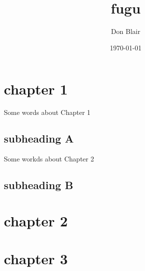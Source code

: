 \documentclass[11pt]{article}
\title{fugu}
\author{Don Blair}
\date{\today}
\begin{document}
\maketitle

\setcounter{tocdepth}{3}
\tableofcontents
\vspace*{1cm}
\section{chapter 1}
\label{sec-1}

Some words about Chapter 1
\subsection{subheading A}
\label{sec-1-1}

Some workds about Chapter 2
\subsection{subheading B}
\label{sec-1-2}
\section{chapter 2}
\label{sec-2}
\section{chapter 3}
\label{sec-3}
\end{document}
